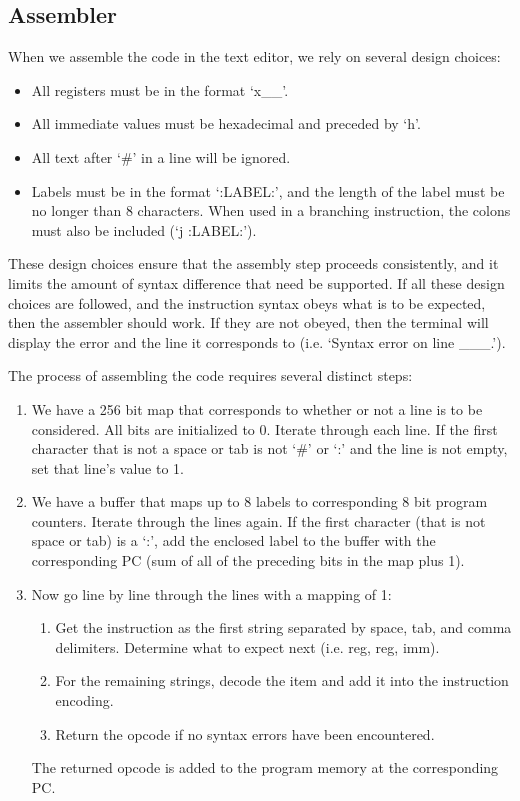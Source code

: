 \documentclass[conference]{IEEEtran}
\begin{document}
\subsection{Assembler}
When we assemble the code in the text editor, we rely on several design choices:
\begin{itemize}
    \item All registers must be in the format `x\_\_'.
    \item All immediate values must be hexadecimal and preceded by `h'. 
    \item All text after `\#' in a line will be ignored.
    \item Labels must be in the format `:LABEL:', and the length of the label must be no longer than 8 characters. When used in a branching instruction, the colons must also be included (`j :LABEL:').
\end{itemize}
These design choices ensure that the assembly step proceeds consistently, and it limits the amount of syntax difference that need be supported. If all these design choices are followed, and the instruction syntax obeys what is to be expected, then the assembler should work. If they are not obeyed, then the terminal will display the error and the line it corresponds to (i.e. `Syntax error on line \_\_\_.'). 

The process of assembling the code requires several distinct steps:
\begin{enumerate}
    \item We have a 256 bit map that corresponds to whether or not a line is to be considered. All bits are initialized to 0. Iterate through each line. If the first character that is not a space or tab is not `\#' or `:' and the line is not empty, set that line's value to 1.
    \item We have a buffer that maps up to 8 labels to corresponding 8 bit program counters. Iterate through the lines again. If the first character (that is not space or tab) is a `:', add the enclosed label to the buffer with the corresponding PC (sum of all of the preceding bits in the map plus 1). 
    \item Now go line by line through the lines with a mapping of 1:
    \begin{enumerate}
        \item Get the instruction as the first string separated by space, tab, and comma delimiters. Determine what to expect next (i.e. reg, reg, imm). 
        \item For the remaining strings, decode the item and add it into the instruction encoding. 
        \item Return the opcode if no syntax errors have been encountered.
    \end{enumerate}
    The returned opcode is added to the program memory at the corresponding PC.
\end{enumerate}
\end{document}
